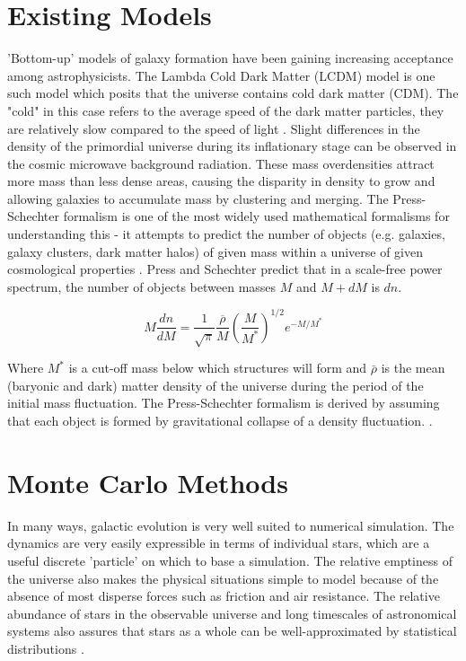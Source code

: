 \documentclass[amsmath,amssymb,reprint,
tightenlines,aps,prl,11pt]{revtex4-1}
\begin{document}
\section{Existing Models}
'Bottom-up' models of galaxy formation have been gaining increasing acceptance among astrophysicists. The Lambda Cold Dark Matter (LCDM) model is one such model which posits that the universe contains cold dark matter (CDM). The "cold" in this case refers to the average speed of the dark matter particles, they are relatively slow compared to the speed of light \cite{FormationGalaxies2019}. Slight differences in the density of the primordial universe during its inflationary stage can be observed in the cosmic microwave background radiation. These mass overdensities attract more mass than less dense areas, causing the disparity in density to grow and allowing galaxies to accumulate mass by clustering and merging. The Press-Schechter formalism is one of the most widely used mathematical formalisms for understanding this - it attempts to predict the number of objects (e.g. galaxies, galaxy clusters, dark matter halos) of given mass within a universe of given cosmological properties \cite{pressFormationGalaxiesClusters1974}. Press and Schechter predict that in a scale-free power spectrum, the number of objects between masses $M$ and $M+dM$ is $dn$.

\begin{equation}
M \frac{d n}{d M}=\frac{1}{\sqrt{\pi}} \frac{\overline{\rho}}{M}\left(\frac{M}{M^{*}}\right)^{1 / 2} e^{-M / M^{*}}
\end{equation} 

Where $M^{*}$ is a cut-off mass below which structures will form and $\bar{\rho}$ is the mean (baryonic and dark) matter density of the universe during the period of the initial mass fluctuation. The Press-Schechter formalism is derived by assuming that each object is formed by gravitational collapse of a density fluctuation. \cite{pressFormationGalaxiesClusters1974}. 

\section{Monte Carlo Methods} 

In many ways, galactic evolution is very well suited to numerical simulation. The dynamics are very easily expressible in terms of individual stars, which are a useful discrete 'particle' on which to base a simulation. The relative emptiness of the universe also makes the physical situations simple to model because of the absence of most disperse forces such as friction and air resistance. The relative abundance of stars in the observable universe and long timescales of astronomical systems also assures that stars as a whole can be well-approximated by statistical distributions \cite{paltaniMonteCarloMethods2011}. \\
\end{document}
